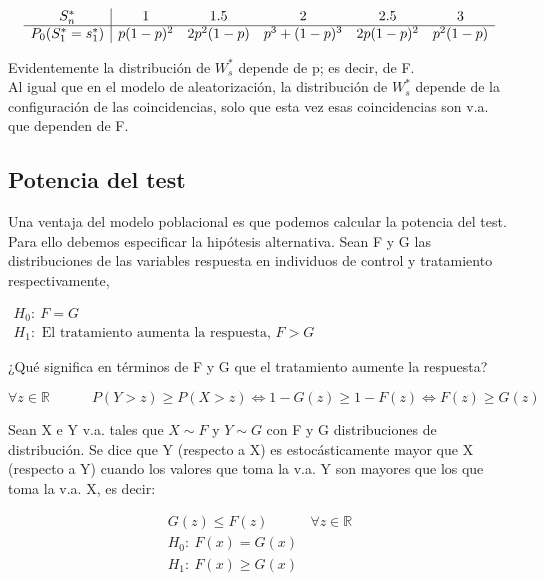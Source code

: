     $$
    \begin{array}{c|c c c c c}
        S^*_n & 1 & 1.5 & 2 & 2.5 & 3 \\ \hline 
        P_0(S^*_1=s^*_1) & p(1-p)^2 & 2p^2(1-p) & p^3+(1-p)^3 & 2p(1-p)^2 & p^2(1-p) \\
    \end{array}
    $$

Evidentemente la distribución de $W^*_s$ depende de p; es decir, de F.\\

Al igual que en el modelo de aleatorización, la distribución de $W^*_s$ depende de la configuración de las coincidencias, solo que esta vez esas coincidencias son v.a. que dependen de F.

\subsection{Potencia del test}
Una ventaja del modelo poblacional es que podemos calcular la potencia del test. Para ello debemos especificar la hipótesis alternativa. Sean F y G las distribuciones de las variables respuesta en individuos de control y tratamiento respectivamente,

$
\begin{array}{c}
    H_0:\ F=G \\
    H_1:\text{ El tratamiento aumenta la respuesta, }F>G
\end{array}
$

¿Qué significa en términos de F y G que el tratamiento aumente la respuesta?

$$
\forall z \in\mathbb{R}\quad\quad\quad P(Y>z)\geq P(X>z) \iff 1-G(z)\geq 1-F(z) \iff F(z)\geq G(z)
$$

\begin{theorem}
    Sean X e Y v.a. tales que $X\sim F$ y $Y\sim G$ con F y G distribuciones de distribución. Se dice que Y (respecto a X) es estocásticamente mayor que X (respecto a Y) cuando los valores que toma la v.a. Y son mayores que los que toma la v.a. X, es decir:
    
    $$
    \begin{array}{c}
        G(z)\leq F(z)\quad\quad\quad\forall z \in\mathbb{R}\\
        H_0:\ F(x)=G(x)\\
        H_1:\ F(x)\geq G(x)
    \end{array}
    $$

\end{theorem}


